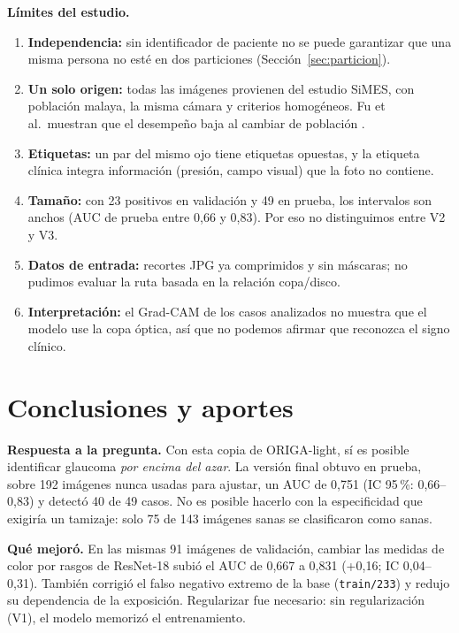 \documentclass[pdflatex,sn-mathphys-num]{sn-jnl}%
\theoremstyle{thmstyleone}%
\theoremstyle{thmstyletwo}%
\theoremstyle{thmstylethree}%
\begin{document}
\textbf{Límites del estudio.}
\begin{enumerate}
\item \textbf{Independencia:} sin identificador de paciente no se puede garantizar que una misma persona no esté en dos particiones (Sección~\ref{sec:particion}).
\item \textbf{Un solo origen:} todas las imágenes provienen del estudio SiMES, con población malaya, la misma cámara y criterios homogéneos. Fu et al.\ muestran que el desempeño baja al cambiar de población \cite{fu2018denet}.
\item \textbf{Etiquetas:} un par del mismo ojo tiene etiquetas opuestas, y la etiqueta clínica integra información (presión, campo visual) que la foto no contiene.
\item \textbf{Tamaño:} con 23 positivos en validación y 49 en prueba, los intervalos son anchos (AUC de prueba entre 0,66 y 0,83). Por eso no distinguimos entre V2 y V3.
\item \textbf{Datos de entrada:} recortes JPG ya comprimidos y sin máscaras; no pudimos evaluar la ruta basada en la relación copa/disco.
\item \textbf{Interpretación:} el Grad-CAM de los casos analizados no muestra que el modelo use la copa óptica, así que no podemos afirmar que reconozca el signo clínico.
\end{enumerate}

\FloatBarrier
\section{Conclusiones y aportes}\label{sec:conclusiones}

\textbf{Respuesta a la pregunta.} Con esta copia de ORIGA-light, sí es posible identificar glaucoma \emph{por encima del azar}. La versión final obtuvo en prueba, sobre 192 imágenes nunca usadas para ajustar, un AUC de 0,751 (IC 95\,\%: 0,66--0,83) y detectó 40 de 49 casos. No es posible hacerlo con la especificidad que exigiría un tamizaje: solo 75 de 143 imágenes sanas se clasificaron como sanas.

\textbf{Qué mejoró.} En las mismas 91 imágenes de validación, cambiar las medidas de color por rasgos de ResNet-18 subió el AUC de 0,667 a 0,831 (+0,16; IC 0,04--0,31). También corrigió el falso negativo extremo de la base (\texttt{train/233}) y redujo su dependencia de la exposición. Regularizar fue necesario: sin regularización (V1), el modelo memorizó el entrenamiento.
\end{document}

